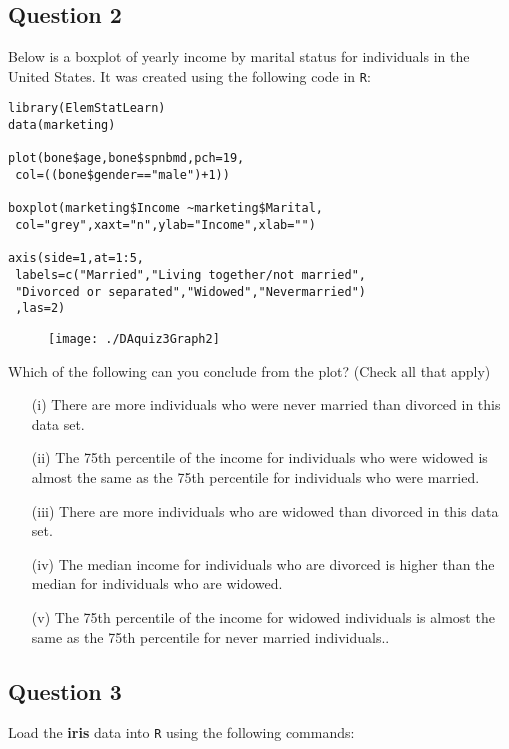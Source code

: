\documentclass[12pt]{article}
\begin{document}

\subsection*{Question 2}
Below is a boxplot of yearly income by marital status for individuals in the
United States. It was created using the following code in \texttt{R}:

\begin{framed}
\begin{verbatim}
library(ElemStatLearn)
data(marketing)

plot(bone$age,bone$spnbmd,pch=19,
 col=((bone$gender=="male")+1))
 
boxplot(marketing$Income ~marketing$Marital,
 col="grey",xaxt="n",ylab="Income",xlab="")

axis(side=1,at=1:5,
 labels=c("Married","Living together/not married",
 "Divorced or separated","Widowed","Nevermarried")
 ,las=2)
\end{verbatim}
\end{framed}
\newpage
\begin{figure}[h!]
\centering
\texttt{[image: ./DAquiz3Graph2]}
\caption{}
\label{fig:DAquiz3Graph1}
\end{figure}

\noindent Which of the following can you conclude from the plot? (Check all that apply)

\begin{itemize}
\item[(i)] There are more individuals who were never married than divorced in this data set. 
\item[(ii)] The 75th percentile of the income for individuals who were widowed is almost the same as the 75th percentile for individuals who were married.
\item[(iii)] There are more individuals who are widowed than divorced in this data set.
\item[(iv)] The median income for individuals who are divorced is higher than the median for individuals who are widowed.
\item[(v)] The 75th percentile of the income for widowed individuals is almost the same as the 75th percentile for never married individuals..
\end{itemize}
\newpage
\subsection*{Question 3}
Load the \textbf{iris} data into \texttt{R} using the following commands:
\end{document}
